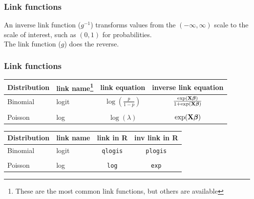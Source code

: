 \documentclass[color=usenames,dvipsnames]{beamer}\usepackage[]{graphicx}\usepackage[]{xcolor}
\begin{document}
\begin{frame}
  \frametitle{Link functions}
  An inverse link function ($g^{-1}$) transforms values from the $(-\infty,\infty)$
  scale to the scale of interest, such as $(0,1)$ for probabilities.  \\
  \pause
  \vfill
  The link function ($g$) does the reverse. \\
\end{frame}


\begin{frame}
  \frametitle{Link functions}
  \centering
  \begin{tabular}{llcc}
    \hline
    Distribution & link name\footnote{\scriptsize These are the most common link functions, but others are available} & link equation             & inverse link equation       \\
    \hline
    Binomial     & logit     & $\log(\frac{p}{1-p})$ & $\frac{\exp({\bf
          X}{\bm \beta})}{1 + \exp({\bf X}{\bm \beta})}$                        \\
                 &           &                           &                             \\
    Poisson      & log       & $\log(\lambda)$               & $\exp({\bf X}{\bm \beta})$  \\
    \hline
  \end{tabular}

\pause
\vfill

\begin{tabular}{llcc}
    \hline
    Distribution & link name & link in {\bf R}  & inv link in {\bf R}       \\
    \hline
    Binomial     & logit     & {\tt qlogis} & {\tt plogis}                        \\
                 &           &                           &                             \\
    Poisson      & log       & {\tt log}    & {\tt exp}  \\
    \hline
  \end{tabular}
\end{frame}
\end{document}
